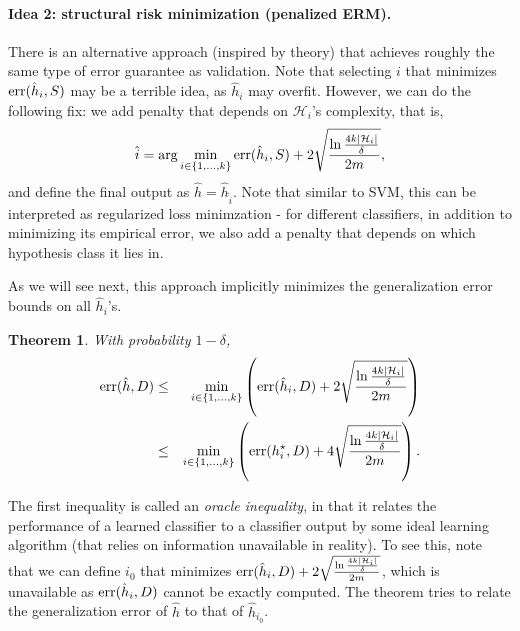 \documentclass{article}
\newtheorem{theorem}{Theorem}
\DeclareMathOperator*{\err}{{\rm err}}
\newcommand{\Hcal}{\mathcal{H}}
\begin{document}
\paragraph{Idea 2: structural risk minimization (penalized ERM).} There is an alternative approach (inspired by theory) that achieves roughly the same type of error guarantee as validation. Note that selecting $i$ that minimizes $\err(\hat{h}_i, S)$ may be a terrible idea, as $\hat{h}_i$ may overfit.
However, we can do the following fix: we add penalty that depends on $\Hcal_i$'s complexity, that is,
\[ \hat{i} = \arg\min_{i \in \cbr{1,\ldots,k}} \err(\hat{h}_i, S) + 2\sqrt{\frac{\ln\frac{4k|\Hcal_i|}{\delta}}{2m}}, \]
and define the final output as $\hat{h} = \hat{h}_{\hat{i}}$. Note that similar to SVM, this can be interpreted as regularized loss minimzation - for different classifiers, in addition to minimizing its empirical error, we also add a penalty that depends on which hypothesis class it lies in.

As we will see next, this approach implicitly minimizes the generalization error bounds on all $\hat{h}_i$'s.


\begin{theorem}
  With probability $1-\delta$,
  \begin{eqnarray*}
    \err(\hat{h}, D) &\leq&
    \min_{i \in \cbr{1,\ldots,k}} \del{\err(\hat{h}_i, D) + 2\sqrt{\frac{\ln\frac{4k|\Hcal_i|}{\delta}}{2m}}} \\
     &\leq& \min_{i \in \cbr{1,\ldots,k}} \del{\err(h_i^\star, D) + 4\sqrt{\frac{\ln\frac{4k|\Hcal_i|}{\delta}}{2m}}}.
  \end{eqnarray*}
\end{theorem}

The first inequality is called an {\em oracle inequality}, in that it relates the performance of a learned classifier to a classifier output by some ideal learning algorithm (that relies on information unavailable in reality). To see this, note that we can define $i_0$ that minimizes $\err(\hat{h}_i, D) + 2\sqrt{\frac{\ln\frac{4k|\Hcal_i|}{\delta}}{2m}}$, which is unavailable as $\err(\hat{h}_i, D)$ cannot be exactly computed. The theorem tries to relate the generalization error of $\hat{h}$ to that of $\hat{h}_{i_0}$.
\end{document}
